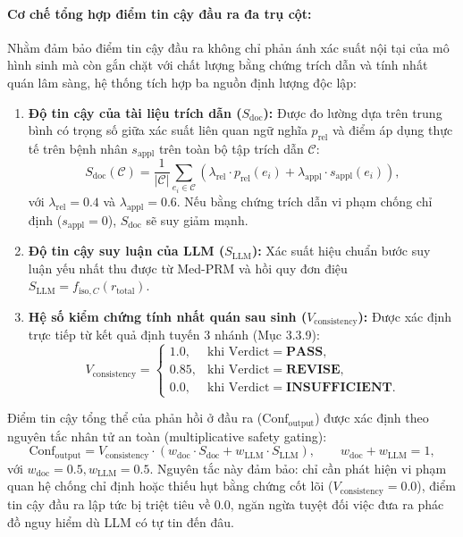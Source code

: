\paragraph{Cơ chế tổng hợp điểm tin cậy đầu ra đa trụ cột:}
Nhằm đảm bảo điểm tin cậy đầu ra không chỉ phản ánh xác suất nội tại của mô hình sinh mà còn gắn chặt với chất lượng bằng chứng trích dẫn và tính nhất quán lâm sàng, hệ thống tích hợp ba nguồn định lượng độc lập:
\begin{enumerate}
    \item \textbf{Độ tin cậy của tài liệu trích dẫn ($S_{\mathrm{doc}}$):} Được đo lường dựa trên trung bình có trọng số giữa xác suất liên quan ngữ nghĩa $p_{\mathrm{rel}}$ và điểm áp dụng thực tế trên bệnh nhân $s_{\mathrm{appl}}$ trên toàn bộ tập trích dẫn $\mathcal{C}$:
    \begin{equation}
        S_{\mathrm{doc}}(\mathcal{C}) = \frac{1}{|\mathcal{C}|} \sum_{e_i \in \mathcal{C}} \left( \lambda_{\mathrm{rel}} \cdot p_{\mathrm{rel}}(e_i) + \lambda_{\mathrm{appl}} \cdot s_{\mathrm{appl}}(e_i) \right),
    \end{equation}
    với $\lambda_{\mathrm{rel}} = 0.4$ và $\lambda_{\mathrm{appl}} = 0.6$. Nếu bằng chứng trích dẫn vi phạm chống chỉ định ($s_{\mathrm{appl}} = 0$), $S_{\mathrm{doc}}$ sẽ suy giảm mạnh.

    \item \textbf{Độ tin cậy suy luận của LLM ($S_{\mathrm{LLM}}$):} Xác suất hiệu chuẩn bước suy luận yếu nhất thu được từ Med-PRM và hồi quy đơn điệu $S_{\mathrm{LLM}} = f_{\mathrm{iso}, C}(r_{\mathrm{total}})$.

    \item \textbf{Hệ số kiểm chứng tính nhất quán sau sinh ($V_{\mathrm{consistency}}$):} Được xác định trực tiếp từ kết quả định tuyến 3 nhánh (Mục 3.3.9):
    \begin{equation}
        V_{\mathrm{consistency}} = \begin{cases}
            1.0, & \text{khi } \mathrm{Verdict} = \mathbf{PASS}, \\
            0.85, & \text{khi } \mathrm{Verdict} = \mathbf{REVISE}, \\
            0.0, & \text{khi } \mathrm{Verdict} = \mathbf{INSUFFICIENT}.
        \end{cases}
    \end{equation}
\end{enumerate}
Điểm tin cậy tổng thể của phản hồi ở đầu ra ($\mathrm{Conf}_{\mathrm{output}}$) được xác định theo nguyên tắc nhân tử an toàn (multiplicative safety gating):
\begin{equation}
    \mathrm{Conf}_{\mathrm{output}} = V_{\mathrm{consistency}} \cdot \left( w_{\mathrm{doc}} \cdot S_{\mathrm{doc}} + w_{\mathrm{LLM}} \cdot S_{\mathrm{LLM}} \right), \qquad w_{\mathrm{doc}} + w_{\mathrm{LLM}} = 1,
\end{equation}
với $w_{\mathrm{doc}} = 0.5, w_{\mathrm{LLM}} = 0.5$. Nguyên tắc này đảm bảo: chỉ cần phát hiện vi phạm quan hệ chống chỉ định hoặc thiếu hụt bằng chứng cốt lõi ($V_{\mathrm{consistency}} = 0.0$), điểm tin cậy đầu ra lập tức bị triệt tiêu về $0.0$, ngăn ngừa tuyệt đối việc đưa ra phác đồ nguy hiểm dù LLM có tự tin đến đâu.

